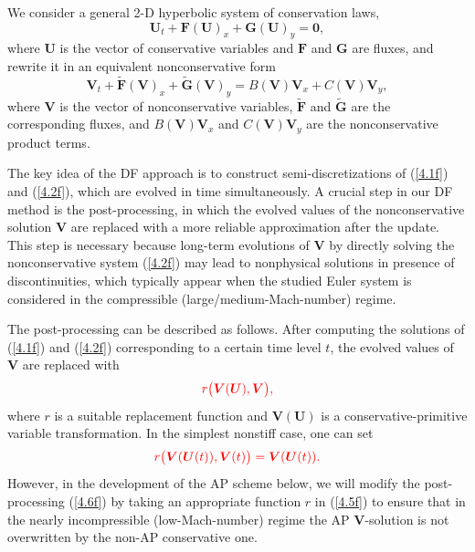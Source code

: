 \documentclass[A4paper,12pt,twoside]{article}
\numberwithin{equation}{section}
\numberwithin{figure}{section}
\numberwithin{table}{section}
\newcommand{\dt}{\Delta t}
\newcommand\eref[1]{(\ref{#1})}
\newcommand{\lore}[1]{{\leavevmode\color{red} #1}}
\begin{document}
We consider a general 2-D hyperbolic system of conservation laws,
\begin{equation}
\bm U_t+\bm F(\bm U)_x+\bm G(\bm U)_y=\bm0,
\label{4.1f}
\end{equation}
where $\bm U$ is the vector of conservative variables and $\bm F$ and $\bm G$ are fluxes, and rewrite it in an equivalent nonconservative
form
\begin{equation}
\bm V_t+\widetilde{\bm F}(\bm V)_x+\widetilde{\bm G}(\bm V)_y=B(\bm V)\bm V_x+C(\bm V)\bm V_y,
\label{4.2f}
\end{equation}
where $\bm V$ is the vector of nonconservative variables, $\widetilde{\bm F}$ and $\widetilde{\bm G}$ are the corresponding fluxes, and
$B(\bm V)\bm V_x$ and $C(\bm V)\bm V_y$ are the nonconservative product terms.

\lore{The key idea of the DF approach is to construct semi-discretizations of \eref{4.1f} and \eref{4.2f}, which are evolved in time simultaneously.} A crucial step in \lore{our DF method} is \lore{the} post-processing, in which the evolved values of the
nonconservative solution $\bm V$ \lore{are} replaced with a more reliable approximation after the update. This step is necessary
because long-term \lore{evolutions} of $\bm V$ by \lore{directly} solving the nonconservative system \eref{4.2f} may lead to \lore{nonphysical solutions in presence of discontinuities, }
which typically appear when the studied Euler system is considered in the compressible (large/medium-Mach-number) regime.

\lore{The} post-processing can be described as follows. After computing the solutions of \eref{4.1f} and \eref{4.2f} \lore{corresponding to a certain time level $t$}, %
the evolved values of \lore{$\bm V$} are replaced with
\begin{equation}
\lore{r\big(\bm V(\bm U),\bm V\big),}
\label{4.5f}
\end{equation}
where $r$ is a suitable replacement function and $\bm V(\bm U)$ is a conservative-primitive variable transformation. In the simplest
nonstiff case, one can set %
\begin{equation}
\lore{r\big(\bm V(\bm U(t)),\bm V(t)\big)=\bm V(\bm U(t)).}
\label{4.6f}
\end{equation}
However, in the development of the AP scheme below, we will modify the post-processing \eref{4.6f} by taking an appropriate function $r$ in
\eref{4.5f} to ensure that in the nearly incompressible (low-Mach-number) regime the AP $\bm V$-solution is not overwritten by the non-AP
conservative one.
\end{document}
